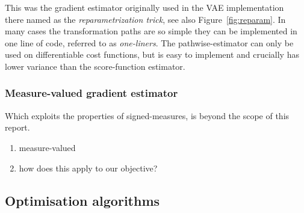 This was the gradient estimator originally used in the VAE implementation~\cite{kingma2013auto} there named as the \emph{reparametrization trick}, see also Figure~\ref{fig:reparam}. In many cases the transformation paths are so simple they can be implemented in one line of code, referred to as \emph{one-liners}. The pathwise-estimator can only be used on differentiable cost functions, but is easy to implement and crucially has lower variance than the score-function estimator.

\subsubsection{Measure-valued gradient estimator}
Which exploits the properties of signed-measures, is beyond the scope of this report.

\begin{enumerate}
	\item measure-valued
	\item how does this apply to our objective?
\end{enumerate}

\subsection{Optimisation algorithms}

